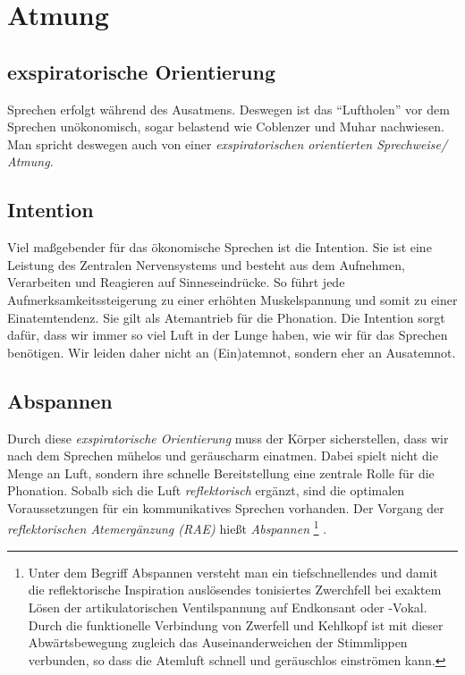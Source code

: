 \documentclass[ngerman, a4paper, twoside]{scrbook}%
\begin{document}
	\section{Atmung}

	\subsection{exspiratorische Orientierung}
	Sprechen erfolgt während des Ausatmens. Deswegen ist das "`Luftholen"' vor dem Sprechen unökonomisch, sogar belastend wie Coblenzer und Muhar nachwiesen. Man spricht deswegen auch von einer \emph{exspiratorischen orientierten Sprechweise/ Atmung}.

	\subsection{Intention}
	Viel maßgebender für das ökonomische Sprechen ist die Intention. Sie ist eine Leistung des Zentralen Nervensystems und besteht aus dem Aufnehmen, Verarbeiten und Reagieren auf Sinneseindrücke. So führt jede Aufmerksamkeitssteigerung zu einer erhöhten Muskelspannung und somit zu einer Einatemtendenz. Sie gilt als Atemantrieb für die Phonation. Die Intention sorgt dafür, dass wir immer so viel Luft in der Lunge haben, wie wir für das Sprechen benötigen. Wir leiden daher nicht an (Ein)atemnot, sondern eher an Ausatemnot.

	\subsection{Abspannen}
	Durch diese \emph{exspiratorische Orientierung} muss der Körper sicherstellen, dass wir nach dem Sprechen mühelos und geräuscharm einatmen. Dabei spielt nicht die Menge an Luft, sondern ihre schnelle Bereitstellung eine zentrale Rolle für die Phonation. Sobalb sich die Luft \emph{reflektorisch} ergänzt, sind die optimalen Voraussetzungen für ein kommunikatives Sprechen vorhanden. Der Vorgang der \emph{reflektorischen Atemergänzung (RAE)} hießt \emph{Abspannen}
	\footnote{Unter dem Begriff Abspannen versteht man ein tiefschnellendes und damit die reflektorische Inspiration auslösendes tonisiertes Zwerchfell bei exaktem Lösen der artikulatorischen Ventilspannung auf Endkonsant oder -Vokal. Durch die funktionelle Verbindung von Zwerfell und Kehlkopf ist mit dieser Abwärtsbewegung zugleich das Auseinanderweichen der Stimmlippen verbunden, so dass die Atemluft schnell und geräuschlos einströmen kann.}
	.
\end{document}
